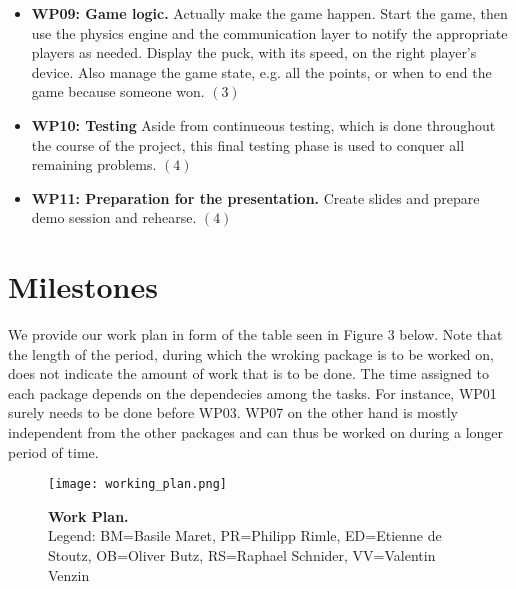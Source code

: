 \documentclass{report}
\begin{document}
\begin{itemize}
	\item {\bf WP09: Game logic.} Actually make the game happen. Start the game, then use the physics engine and the communication layer to notify the appropriate players as needed. Display the puck, with its speed, on the right player's device. Also manage the game state, e.g. all the points, or when to end the game because someone won. $(3)$

         \item {\bf WP10:  Testing} Aside from continueous testing, which is done throughout the course of the project, this final testing phase is used to conquer all remaining problems. $(4)$
         
         \item {\bf WP11: Preparation for the presentation.} Create slides and prepare demo session and rehearse. $(4)$
         
\end{itemize}
 
\section{Milestones}
We provide our work plan in form of the table seen in Figure 3 below. Note that the length of the period, during which the wroking package is to be worked on, does not indicate the amount of work that is to be done. The time assigned to each package depends on the dependecies among the tasks. For instance, WP01 surely needs to be done before WP03. WP07 on the other hand is mostly independent from the other packages and can thus be worked on during a longer period of time. 

\begin{landscape}
 \begin{figure}
  \centering
  \texttt{[image: working\_plan.png]}
  \caption{\textbf{Work Plan.} \\ \textmd{Legend: BM=Basile Maret, PR=Philipp Rimle, ED=Etienne de Stoutz, OB=Oliver Butz, RS=Raphael Schnider, VV=Valentin Venzin}}
 \end{figure}
\end{landscape}





\end{document}
